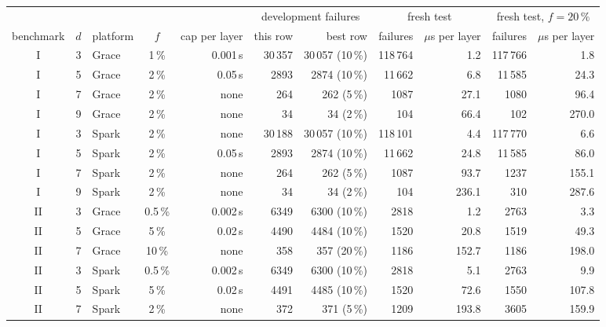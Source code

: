 \begin{tabular}{@{}cclcrrrrrrr@{}}
\toprule
& & & & & \multicolumn{2}{c}{development failures} & \multicolumn{2}{c}{fresh test} & \multicolumn{2}{c}{fresh test, $f=20\,\%$} \\
\cmidrule(lr){6-7}\cmidrule(lr){8-9}\cmidrule(lr){10-11}
benchmark & $d$ & platform & $f$ & cap per layer & this row & best row & failures & $\mu$s per layer & failures & $\mu$s per layer \\
\midrule
I & 3 & Grace & 1\,\% & 0.001\,s & 30\,357 & 30\,057 (10\,\%) & 118\,764 & 1.2 & 117\,766 & 1.8 \\
I & 5 & Grace & 2\,\% & 0.05\,s & 2893 & 2874 (10\,\%) & 11\,662 & 6.8 & 11\,585 & 24.3 \\
I & 7 & Grace & 2\,\% & none & 264 & 262 (5\,\%) & 1087 & 27.1 & 1080 & 96.4 \\
I & 9 & Grace & 2\,\% & none & 34 & 34 (2\,\%) & 104 & 66.4 & 102 & 270.0 \\
I & 3 & Spark & 2\,\% & none & 30\,188 & 30\,057 (10\,\%) & 118\,101 & 4.4 & 117\,770 & 6.6 \\
I & 5 & Spark & 2\,\% & 0.05\,s & 2893 & 2874 (10\,\%) & 11\,662 & 24.8 & 11\,585 & 86.0 \\
I & 7 & Spark & 2\,\% & none & 264 & 262 (5\,\%) & 1087 & 93.7 & 1237 & 155.1 \\
I & 9 & Spark & 2\,\% & none & 34 & 34 (2\,\%) & 104 & 236.1 & 310 & 287.6 \\
\midrule
II & 3 & Grace & 0.5\,\% & 0.002\,s & 6349 & 6300 (10\,\%) & 2818 & 1.2 & 2763 & 3.3 \\
II & 5 & Grace & 5\,\% & 0.02\,s & 4490 & 4484 (10\,\%) & 1520 & 20.8 & 1519 & 49.3 \\
II & 7 & Grace & 10\,\% & none & 358 & 357 (20\,\%) & 1186 & 152.7 & 1186 & 198.0 \\
II & 3 & Spark & 0.5\,\% & 0.002\,s & 6349 & 6300 (10\,\%) & 2818 & 5.1 & 2763 & 9.9 \\
II & 5 & Spark & 5\,\% & 0.02\,s & 4491 & 4485 (10\,\%) & 1520 & 72.6 & 1550 & 107.8 \\
II & 7 & Spark & 2\,\% & none & 372 & 371 (5\,\%) & 1209 & 193.8 & 3605 & 159.9 \\
\bottomrule
\end{tabular}
